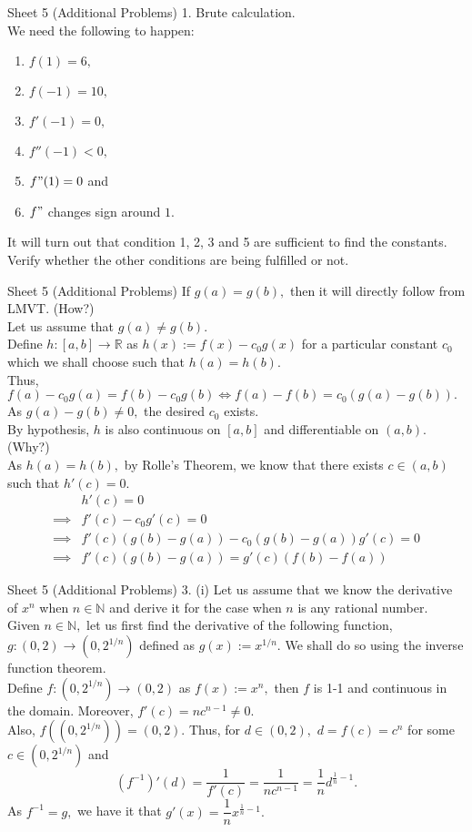 \documentclass[handout, aspectratio=169]{beamer}
\begin{document}
\begin{frame}{Sheet 5 (Additional Problems)}
	1. Brute calculation.\\
	We need the following to happen:\\
	\begin{enumerate} 
		\item $f(1) = 6,$
		\item $f(-1) = 10,$
		\item $f'(-1) = 0,$
		\item $f''(-1) < 0,$
		\item $f"(1) = 0$ and
		\item $f"$ changes sign around $1.$
	\end{enumerate}
	It will turn out that condition 1, 2, 3 and 5 are sufficient to find the constants. Verify whether the other conditions are being fulfilled or not.
\end{frame}
\begin{frame}{Sheet 5 (Additional Problems)}
	If $g(a) = g(b),$ then it will directly follow from LMVT. (How?)\\
	Let us assume that $g(a) \neq g(b).$\\
	Define $h:[a, b] \to \mathbb{R}$ as $h(x) := f(x) - c_0g(x)$ for a particular constant $c_0$ which we shall choose such that $h(a) = h(b).$\\
	Thus, $f(a) - c_0g(a) = f(b) - c_0g(b) \iff f(a) - f(b) = c_0(g(a) - g(b)).$ As $g(a) - g(b) \neq 0,$ the desired $c_0$ exists.\\
	By hypothesis, $h$ is also continuous on $[a, b]$ and differentiable on $(a, b).$ (Why?)\\
	As $h(a) = h(b),$ by Rolle's Theorem, we know that there exists $c \in (a, b)$ such that $h'(c) = 0.$\\
	\begin{align*}
		&h'(c) = 0\\
		\implies& f'(c) - c_0g'(c) = 0\\
		\implies& f'(c)(g(b) - g(a)) - c_0(g(b) - g(a))g'(c) = 0\\
		\implies& f'(c)(g(b) - g(a)) = g'(c)(f(b) - f(a))
	\end{align*}
\end{frame}
\begin{frame}{Sheet 5 (Additional Problems)}
	3. (i) Let us assume that we know the derivative of $x^n$ when $n \in \mathbb{N}$ and derive it for the case when $n$ is any rational number. \\
	Given $n \in \mathbb{N},$ let us first find the derivative of the following function, $g:(0, 2) \to (0, 2^{1/n})$ defined as $g(x) := x^{1/n}.$ We shall do so using the inverse function theorem.\\
	Define $f:(0, 2^{1/n}) \to (0, 2)$ as $f(x) := x^n,$ then $f$ is 1-1 and continuous in the domain. Moreover, $f'(c) = nc^{n-1} \neq 0.$\\
	Also, $f\left((0,2^{1/n})\right) = (0, 2).$	Thus, for $d \in (0, 2),$ $d = f(c) = c^n$ for some $c \in (0, 2^{1/n})$ and
	\[(f^{-1})'(d) = \dfrac{1}{f'(c)} = \dfrac{1}{nc^{n-1}} = \dfrac{1}{n}d^{\frac{1}{n} - 1}.\]
	As $f^{-1} = g,$ we have it that $g'(x) = \dfrac{1}{n}x^{\frac{1}{n} - 1}.$
\end{frame}
\end{document}
